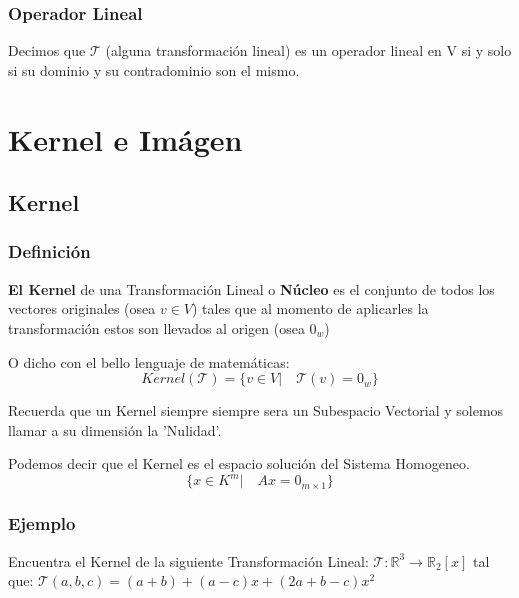 \documentclass[12pt]{report}                                %
\begin{document}
        \subsubsection{Operador Lineal}
            Decimos que $\mathscr{T}$ (alguna transformación lineal) es un
            operador lineal en V si y solo si su dominio y su contradominio son el mismo.


    \clearpage
    \section{Kernel e Imágen}

        \subsection{Kernel}
        \subsubsection{Definición}
        \textbf{El Kernel} de una Transformación Lineal o \textbf{Núcleo} es el conjunto 
        de todos los vectores originales (osea $v \in V$) tales que al momento de
        aplicarles la transformación estos son llevados al origen (osea $0_w$)

        O dicho con el bello lenguaje de matemáticas:
        \begin{equation}
            Kernel(\mathscr{T}) = \{v \in V |\quad \mathscr{T}(v) = 0_w\}
        \end{equation}

        Recuerda que un Kernel siempre siempre sera un Subespacio Vectorial y solemos
        llamar a su dimensión la 'Nulidad'.

        Podemos decir que el Kernel es el espacio solución del Sistema Homogeneo.
        \begin{equation*}
            \{x \in K^m |\quad Ax = 0_{m \times 1} \}
        \end{equation*}

            \clearpage
            \subsubsection{Ejemplo}
            Encuentra el Kernel de la siguiente Transformación Lineal:
            $\mathscr{T} : \mathbb{R}^3 \to \mathbb{R}_2[x]$ tal que: 
            $\mathscr{T}(a,b,c) = (a+b) + (a-c)x + (2a+b-c)x^2$
\end{document}
